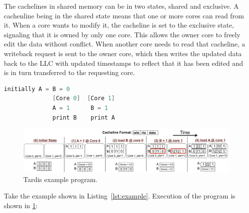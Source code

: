 \documentclass[12pt]{article}
\begin{document}
	
	The cachelines in shared memory can be in two states, shared and exclusive. A cachenline being in the shared state means that one or more cores can read from it. When a core wants to modify it, the cacheline is set to the exclusive state, signaling that it is owned by only one core. This allows the owner core to freely edit the data without conflict. When another core needs to read that cacheline, a writeback request is sent to the owner core, which then writes the updated data back to the LLC with updated timestamps to reflect that it has been edited and is in turn transferred to the requesting core.
	
	
	
	
	
	
	\vspace{-.1in}
	
	\begin{lstlisting}[language=C,label={lst:example},caption={Example 
	Program}]
			  initially A = B = 0
			  [Core 0]	[Core 1]
			  A = 1		 B = 1
			  print B	 print A
	\end{lstlisting}
	
	
	\begin{figure}
		\centering
		\includegraphics[width=0.95\columnwidth]{figs/example.pdf}
		\caption{ Tardis example program.}
		\label{fig:example}
	\end{figure}
	
	
	Take the example shown in Listing~\ref{lst:example}. Execution of the program is shown in \cref{fig:example}:
	
\end{document}
